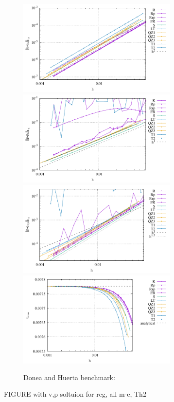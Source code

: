 \documentclass[a4paper]{article}
\begin{document}
\begin{figure}
\centering
\includegraphics[width=8cm]{../results/errors_u_exp1}
\includegraphics[width=8cm]{../results/errors_p_exp1}\\
\includegraphics[width=8cm]{../results/errors_q1_exp1}
\includegraphics[width=8cm]{../results/vrms_exp1}
\caption{Donea and Huerta benchmark:} \label{fig:resdh}
\end{figure}

FIGURE with v,p soltuion for reg, all m-e, Th2
\end{document}
